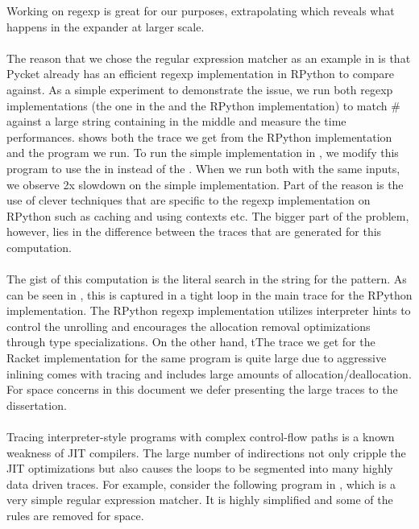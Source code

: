 			Working on regexp is great for our purposes, extrapolating which reveals what happens in the expander at larger scale.

			\paragraph{}%
			The reason that we chose the regular expression matcher as an example
			in  is that Pycket already has an efficient regexp
			implementation in RPython to compare against. As a simple experiment
			to demonstrate the issue, we run both regexp implementations (the one
			in the  and the RPython implementation) to match
			$\mathtt{\#}$ against a large string containing
			 in the middle and measure the time
			performances.  shows both the trace we get
			from the RPython implementation and the program we run. To run the
			simple implementation in , we modify this program
			to use the  in instead of the
			. When we run both with the same inputs, we
			observe 2x slowdown on the simple implementation. Part of the reason
			is the use of clever techniques that are specific to the regexp
			implementation on RPython such as caching and using contexts etc. The
			bigger part of the problem, however, lies in the difference between
			the traces that are generated for this computation.

			\paragraph{}%
			The gist of this computation is the literal search in the string for
			the  pattern. As can be seen in
			, this is captured in a tight loop in the
			main trace for the RPython implementation. The RPython regexp
			implementation utilizes interpreter hints to control the unrolling and
			encourages the allocation removal optimizations through type
			specializations. On the other hand, tThe trace we get for the Racket
			implementation for the same program is quite large due to aggressive
			inlining comes with tracing and includes large amounts of
			allocation/deallocation. For space concerns in this document we defer
			presenting the large traces to the dissertation.


		\paragraph{}%
		Tracing interpreter-style programs with complex control-flow paths is
		a known weakness of JIT compilers. The large number of indirections
		not only cripple the JIT optimizations but also causes the loops to be
		segmented into many highly data driven traces. For
		example, consider the following program in , which
		is a very simple regular expression matcher. It is highly simplified
		and some of the rules are removed for space.

